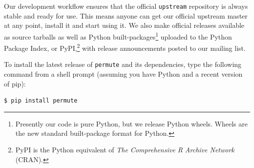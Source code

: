 \documentclass[]{article}
\begin{document}
Our development workflow ensures that the official \texttt{upstream} repository
is always stable and ready for use.
This means anyone can get our official upstream master at any point, install it
and start using it.
We also make official releases available as source tarballs as well as Python
built-packages\footnote{Presently our code is pure Python, but we release
Python wheels.
Wheels are the new standard built-package format for Python.} uploaded to the
Python Package Index, or PyPI,\footnote{PyPI is the Python equivalent of \emph{The
Comprehensive R Archive Network} (CRAN).} with release announcements posted to
our mailing list.

To install the latest release of \texttt{permute} and its dependencies, type
the following command from a shell prompt (assuming you have Python and a
recent version of pip):

\texttt{\$ pip install permute}
\end{document}
